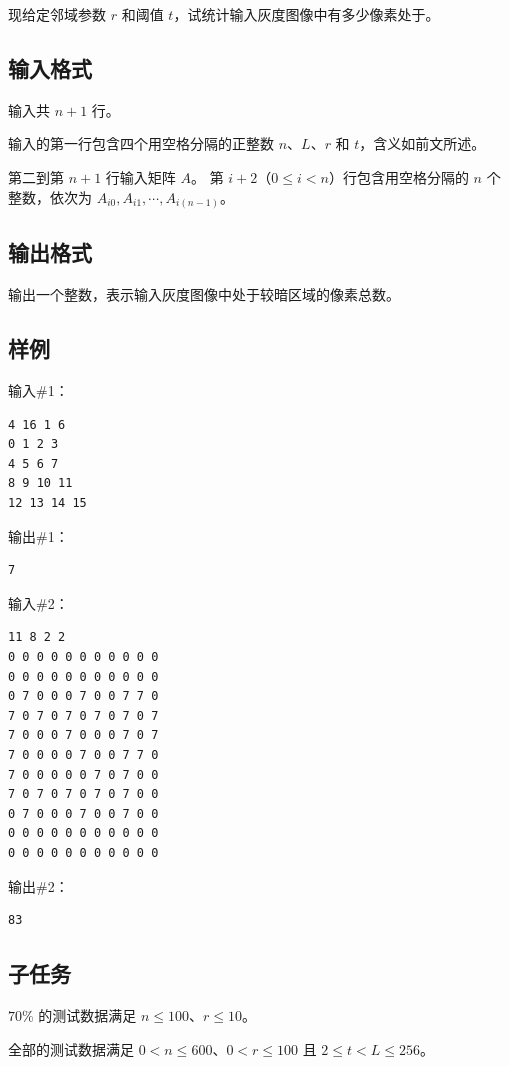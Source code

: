 现给定邻域参数 $r$ 和阈值 $t$，试统计输入灰度图像中有多少像素处于{}。


\subsection*{输入格式}

输入共 $n + 1$ 行。

输入的第一行包含四个用空格分隔的正整数 $n$、$L$、$r$ 和 $t$，含义如前文所述。

第二到第 $n + 1$ 行输入矩阵 $A$。
第 $i + 2$（$0 \le i < n$）行包含用空格分隔的 $n$ 个整数，依次为 $A_{i0}, A_{i1}, \cdots, A_{i(n-1)}$。


\subsection*{输出格式}

输出一个整数，表示输入灰度图像中处于较暗区域的像素总数。

\subsection*{样例}

输入\#1：

\begin{lstlisting}
4 16 1 6
0 1 2 3
4 5 6 7
8 9 10 11
12 13 14 15
\end{lstlisting}

输出\#1：

\begin{lstlisting}
7
\end{lstlisting}

输入\#2：

\begin{lstlisting}
11 8 2 2
0 0 0 0 0 0 0 0 0 0 0
0 0 0 0 0 0 0 0 0 0 0
0 7 0 0 0 7 0 0 7 7 0
7 0 7 0 7 0 7 0 7 0 7
7 0 0 0 7 0 0 0 7 0 7
7 0 0 0 0 7 0 0 7 7 0
7 0 0 0 0 0 7 0 7 0 0
7 0 7 0 7 0 7 0 7 0 0
0 7 0 0 0 7 0 0 7 0 0
0 0 0 0 0 0 0 0 0 0 0
0 0 0 0 0 0 0 0 0 0 0
\end{lstlisting}

输出\#2：

\begin{lstlisting}
83
\end{lstlisting}

\subsection*{子任务}

$70\%$ 的测试数据满足 $n \le 100$、$r \le 10$。

全部的测试数据满足 $0 < n \le 600$、$0 < r \le 100$ 且 $2 \le t < L \le 256$。
